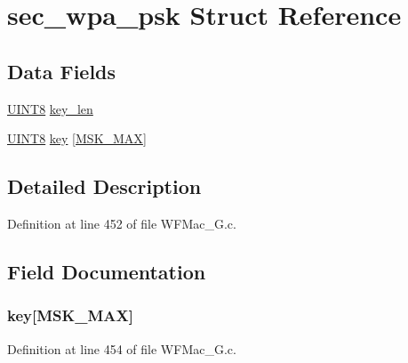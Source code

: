 \hypertarget{structsec__wpa__psk}{}\section{sec\+\_\+wpa\+\_\+psk Struct Reference}
\label{structsec__wpa__psk}
\subsection*{Data Fields}
\begin{DoxyCompactItemize}
\item 
\hyperlink{_generic_type_defs_8h_ab27e9918b538ce9d8ca692479b375b6a}{U\+I\+N\+T8} \hyperlink{structsec__wpa__psk_a0ea1de94c3f3ce62f43a44576691a3cb}{key\+\_\+len}
\item 
\hyperlink{_generic_type_defs_8h_ab27e9918b538ce9d8ca692479b375b6a}{U\+I\+N\+T8} \hyperlink{structsec__wpa__psk_a98a07885464f778c9844f9ecb5752b1b}{key} \mbox{[}\hyperlink{_w_f_mac__24_g_8c_ac5b95f02723021833cc47477b06a962cae209eaa08a8ad04a792aaac2f273acd6}{M\+S\+K\+\_\+\+M\+A\+X}\mbox{]}
\end{DoxyCompactItemize}


\subsection{Detailed Description}


Definition at line 452 of file W\+F\+Mac\+\_\+G.\+c.



\subsection{Field Documentation}
\hypertarget{structsec__wpa__psk_a98a07885464f778c9844f9ecb5752b1b}{}
\subsubsection[{key}]{ key\mbox{[}{\bf M\+S\+K\+\_\+\+M\+A\+X}\mbox{]}}\label{structsec__wpa__psk_a98a07885464f778c9844f9ecb5752b1b}


Definition at line 454 of file W\+F\+Mac\+\_\+G.\+c.

\hypertarget{structsec__wpa__psk_a0ea1de94c3f3ce62f43a44576691a3cb}{}
